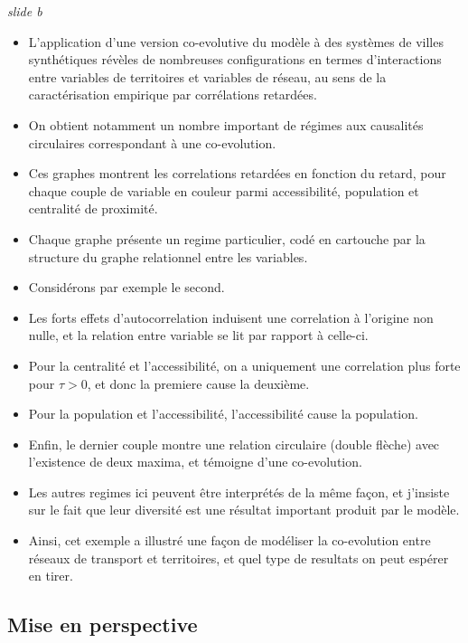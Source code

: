 \documentclass[12pt]{article}
\begin{document}
\newpage

\textit{slide b}
	
\begin{itemize}
	\item L'application d'une version co-evolutive du modèle à des systèmes de villes synthétiques révèles de nombreuses configurations en termes d'interactions entre variables de territoires et variables de réseau, au sens de la caractérisation empirique par corrélations retardées.
	\item On obtient notamment un nombre important de régimes aux causalités circulaires correspondant à une co-evolution.
	\item Ces graphes montrent les correlations retardées en fonction du retard, pour chaque couple de variable en couleur parmi accessibilité, population et centralité de proximité.
	\item Chaque graphe présente un regime particulier, codé en cartouche par la structure du graphe relationnel entre les variables.
	\item Considérons par exemple le second.
	\item Les forts effets d'autocorrelation induisent une correlation à l'origine non nulle, et la relation entre variable se lit par rapport à celle-ci.
	\item Pour la centralité et l'accessibilité, on a uniquement une correlation plus forte pour $\tau > 0$, et donc la premiere cause la deuxième.
	\item Pour la population et l'accessibilité, l'accessibilité cause la population.
	\item Enfin, le dernier couple montre une relation circulaire (double flèche) avec l'existence de deux maxima, et témoigne d'une co-evolution.
	\item Les autres regimes ici peuvent être interprétés de la même façon, et j'insiste sur le fait que leur diversité est une résultat important produit par le modèle.
	\item Ainsi, cet exemple a illustré une façon de modéliser la co-evolution entre réseaux de transport et territoires, et quel type de resultats on peut espérer en tirer.
\end{itemize}



\newpage

\subsection*{Mise en perspective}
\end{document}
